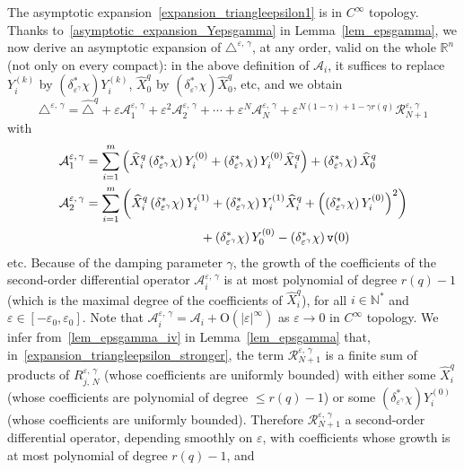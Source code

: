 \documentclass[10pt]{amsart}
\theoremstyle{definition}\newtheorem{defi}[theo]{Definition}\newtheorem{rema}[theo]{Remark}\newtheorem{exam}[theo]{Example}\newtheorem{exem}[theo]{Example}\newtheorem{nota}[theo]{Notation}
\newcommand*\R{\mathbb{R}}
\newcommand*\N{\mathbb{N}}
\newcommand{\calA}{\mathcal{A}}
\newcommand{\calR}{\mathcal{R}}
\newcommand{\ttv}{\mathtt{v}}
\newcommand{\rmO}{\mathrm{O}}
\renewcommand{\leq}{\leqslant}
\begin{document}
The asymptotic expansion~\eqref{expansion_triangleepsilon1} is in $C^\infty$ topology. Thanks to~\eqref{asymptotic_expansion_Yepsgamma} in Lemma~\ref{lem_epsgamma}, we now derive an asymptotic expansion of $\triangle^{\varepsilon,\,\gamma}$, at any order, valid on the whole $\R^n$ (not only on every compact): in the above definition of $\calA_i$, it suffices to replace $Y_i^{(k)}$ by $(\delta_{\varepsilon^\gamma}^*\chi)Y_i^{(k)}$, $\widehat{X}_0^q$ by $(\delta_{\varepsilon^\gamma}^*\chi)\widehat{X}_0^q$, etc, and we obtain
\begin{equation}\label{expansion_triangleepsilon_stronger}
\triangle^{\varepsilon,\,\gamma} = \widehat{\triangle}^{q} + \varepsilon \calA_1^{\varepsilon,\,\gamma} + \varepsilon^2 \calA_2^{\varepsilon,\,\gamma} + \cdots + \varepsilon^N \calA_N^{\varepsilon,\,\gamma} + \varepsilon^{N(1-\gamma)+1-\gamma r(q)} \calR_{N+1}^{\varepsilon,\,\gamma}
\end{equation}
with
\begin{equation}\label{def_Aiepsgam}
\begin{split}
\calA_1^{\varepsilon,\,\gamma} &= \sum_{i=1}^m \left(\widehat{X}^{q}_i \left(\delta_{\varepsilon^\gamma}^*\chi\right) Y^{(0)}_i + \left(\delta_{\varepsilon^\gamma}^*\chi\right) Y^{(0)}_i \widehat{X}^{q}_i \right) + \left(\delta_{\varepsilon^\gamma}^*\chi\right) \widehat{X}^{q}_0 \\
\calA_2^{\varepsilon,\,\gamma} &= \sum_{i=1}^m \left(\widehat{X}^{q}_i \left(\delta_{\varepsilon^\gamma}^*\chi\right) Y^{(1)}_i + \left(\delta_{\varepsilon^\gamma}^*\chi\right) Y^{(1)}_i \widehat{X}^{q}_i + \left(\left(\delta_{\varepsilon^\gamma}^*\chi\right) Y^{(0)}_i \right)^2 \right) \\
& \mkern165mu + \left(\delta_{\varepsilon^\gamma}^*\chi\right) Y^{(0)}_0 - \left(\delta_{\varepsilon^\gamma}^*\chi\right) \ttv(0)
\end{split}
\end{equation}
etc. Because of the damping parameter $\gamma$, the growth of the coefficients of the second-order differential operator $\calA_i^{\varepsilon,\,\gamma}$ is at most polynomial of degree $r(q)-1$ (which is the maximal degree of the coefficients of $\widehat{X}^{q}_i$), for all $i\in\N^*$ and $\varepsilon\in[-\varepsilon_0,\varepsilon_0]$. Note that $\calA_i^{\varepsilon,\,\gamma} = \calA_i + \rmO(\vert\varepsilon\vert^\infty)$ as $\varepsilon\rightarrow 0$ in $C^\infty$ topology. We infer from~\eqref{lem_epsgamma_iv} in Lemma~\ref{lem_epsgamma} that, in~\eqref{expansion_triangleepsilon_stronger}, the term $\calR_{N+1}^{\varepsilon,\,\gamma}$ is a finite sum of products of $R_{j,\,N}^{\varepsilon,\,\gamma}$ (whose coefficients are uniformly bounded) with either some $\widehat{X}^{q}_i$ (whose coefficients are polynomial of degree $\leq r(q)-1$) or some $(\delta_{\varepsilon^\gamma}^*\chi) Y^{(0)}_i$ (whose coefficients are uniformly bounded). Therefore $\calR_{N+1}^{\varepsilon,\,\gamma}$ a second-order differential operator, depending smoothly on $\varepsilon$, with coefficients whose growth is at most polynomial of degree $r(q)-1$, and
\end{document}
